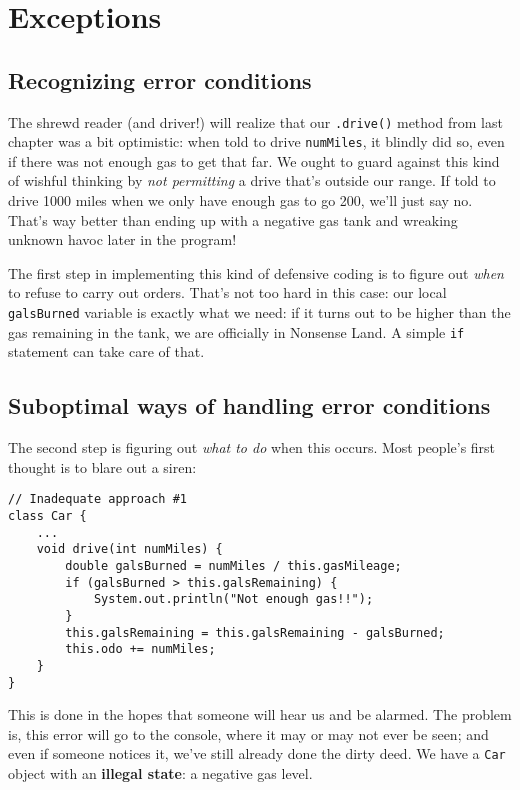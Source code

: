 \chapter{Exceptions}

\section{Recognizing error conditions}

The shrewd reader (and driver!) will realize that our \texttt{.drive()} method
from last chapter was a bit optimistic: when told to drive \texttt{numMiles},
it blindly did so, even if there was not enough gas to get that far. We ought
to guard against this kind of wishful thinking by \textit{not permitting} a
drive that's outside our range. If told to drive 1000 miles when we only have
enough gas to go 200, we'll just say no. That's way better than ending up with
a negative gas tank and wreaking unknown havoc later in the program!

The first step in implementing this kind of defensive coding is to figure out
\textit{when} to refuse to carry out orders. That's not too hard in this case:
our local \texttt{galsBurned} variable is exactly what we need: if it turns
out to be higher than the gas remaining in the tank, we are officially in
Nonsense Land. A simple \texttt{if} statement can take care of that.

\section{Suboptimal ways of handling error conditions}

The second step is figuring out \textit{what to do} when this occurs. Most
people's first thought is to blare out a siren:

\begin{Verbatim}[samepage=true,fontsize=\scriptsize,frame=single]
// Inadequate approach #1
class Car {
    ...
    void drive(int numMiles) {
        double galsBurned = numMiles / this.gasMileage;
        if (galsBurned > this.galsRemaining) {
            System.out.println("Not enough gas!!");
        }
        this.galsRemaining = this.galsRemaining - galsBurned;
        this.odo += numMiles;
    }
}
\end{Verbatim}

This is done in the hopes that someone will hear us and be alarmed. The
problem is, this error will go to the console, where it may or may not ever be
seen; and even if someone notices it, we've still already done the dirty deed.
We have a \texttt{Car} object with an \textbf{illegal state}: a negative gas
level.

